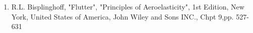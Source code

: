 \begin{enumerate}
    \item{R.L. Bisplinghoff, "Flutter", "Principles of Aeroelasticity", 1st Edition, New York, United States of America, John Wiley and Sons INC., Chpt 9,pp. 527-631 }
\end{enumerate}